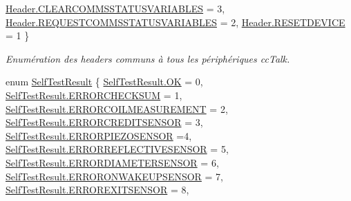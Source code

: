 \begin{DoxyCompactItemize}
\newline
\mbox{\hyperlink{group___header_gga22f8eb6526627d4203e53ce7dbd3052aafb4cfb0ac631109fa01bdbd70ba8e166}{Header.\+C\+L\+E\+A\+R\+C\+O\+M\+M\+S\+S\+T\+A\+T\+U\+S\+V\+A\+R\+I\+A\+B\+L\+ES}} = 3, 
\mbox{\hyperlink{group___header_gga22f8eb6526627d4203e53ce7dbd3052aaacaa18d8173ad7149b61185d29c4f3bb}{Header.\+R\+E\+Q\+U\+E\+S\+T\+C\+O\+M\+M\+S\+S\+T\+A\+T\+U\+S\+V\+A\+R\+I\+A\+B\+L\+ES}} = 2, 
\mbox{\hyperlink{group___header_gga22f8eb6526627d4203e53ce7dbd3052aab87acc3ce509b6e2b20a564607eb06d8}{Header.\+R\+E\+S\+E\+T\+D\+E\+V\+I\+CE}} = 1
 \}
\begin{DoxyCompactList}\small\item\em Enumération des headers communs à tous les périphériques cc\+Talk. \end{DoxyCompactList}\item 
enum \mbox{\hyperlink{group___erreur_ga179570d2d8f6f95d52ccafb98d20c790}{Self\+Test\+Result}} \{ \newline
\mbox{\hyperlink{group___erreur_gga179570d2d8f6f95d52ccafb98d20c790ae0aa021e21dddbd6d8cecec71e9cf564}{Self\+Test\+Result.\+OK}} = 0, 
\mbox{\hyperlink{group___erreur_gga179570d2d8f6f95d52ccafb98d20c790a82728633b7a7c49ed136d5c3aa605861}{Self\+Test\+Result.\+E\+R\+R\+O\+R\+C\+H\+E\+C\+K\+S\+UM}} = 1, 
\mbox{\hyperlink{group___erreur_gga179570d2d8f6f95d52ccafb98d20c790aa4c8c213e52281611bbc2d726f23959a}{Self\+Test\+Result.\+E\+R\+R\+O\+R\+C\+O\+I\+L\+M\+E\+A\+S\+U\+R\+E\+M\+E\+NT}} = 2, 
\mbox{\hyperlink{group___erreur_gga179570d2d8f6f95d52ccafb98d20c790a4ef2b74a0cc5d6393ce608c54b1861f0}{Self\+Test\+Result.\+E\+R\+R\+O\+R\+C\+R\+E\+D\+I\+T\+S\+E\+N\+S\+OR}} = 3, 
\newline
\mbox{\hyperlink{group___erreur_gga179570d2d8f6f95d52ccafb98d20c790a45609713be805992c730f031ff8f54ca}{Self\+Test\+Result.\+E\+R\+R\+O\+R\+P\+I\+E\+Z\+O\+S\+E\+N\+S\+OR}} =4, 
\mbox{\hyperlink{group___erreur_gga179570d2d8f6f95d52ccafb98d20c790abe71e29807fc8e2627732f98b625dd63}{Self\+Test\+Result.\+E\+R\+R\+O\+R\+R\+E\+F\+L\+E\+C\+T\+I\+V\+E\+S\+E\+N\+S\+OR}} = 5, 
\mbox{\hyperlink{group___erreur_gga179570d2d8f6f95d52ccafb98d20c790a06c7dd879850f00fcce4a46b4f0f4baf}{Self\+Test\+Result.\+E\+R\+R\+O\+R\+D\+I\+A\+M\+E\+T\+E\+R\+S\+E\+N\+S\+OR}} = 6, 
\mbox{\hyperlink{group___erreur_gga179570d2d8f6f95d52ccafb98d20c790afd502fbfb573105b14080349c146d0da}{Self\+Test\+Result.\+E\+R\+R\+O\+R\+O\+N\+W\+A\+K\+E\+U\+P\+S\+E\+N\+S\+OR}} = 7, 
\newline
\mbox{\hyperlink{group___erreur_gga179570d2d8f6f95d52ccafb98d20c790afc13d39d093e34a09c0a0314e20048ee}{Self\+Test\+Result.\+E\+R\+R\+O\+R\+E\+X\+I\+T\+S\+E\+N\+S\+OR}} = 8, 

\end{DoxyCompactItemize}

